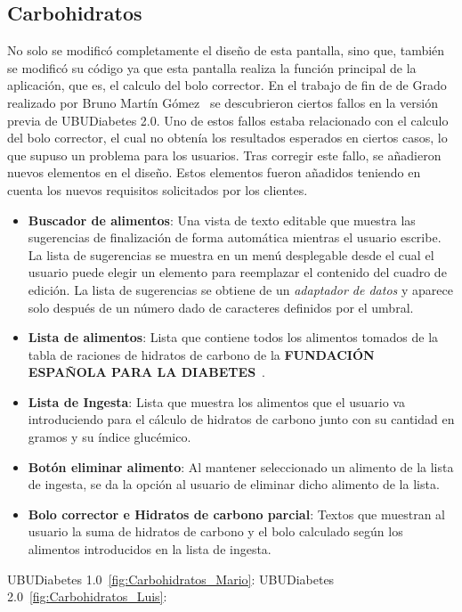 \subsection{Carbohidratos}
No solo se modificó completamente el diseño de esta pantalla, sino que, también se modificó su código ya que esta pantalla realiza la función principal de la aplicación, que es, el calculo del bolo corrector. En el trabajo de fin de de Grado realizado por Bruno Martín Gómez~\cite{bruno2017} se descubrieron ciertos fallos en la versión previa de UBUDiabetes 2.0. Uno de estos fallos estaba relacionado con el calculo del bolo corrector, el cual no obtenía los resultados esperados en ciertos casos, lo que supuso un problema para los usuarios. Tras corregir este fallo, se añadieron nuevos elementos en el diseño. Estos elementos fueron añadidos teniendo en cuenta los nuevos requisitos solicitados por los clientes.\\
\begin{itemize}
	\item \textbf{Buscador de alimentos}: Una vista de texto editable que muestra las sugerencias de finalización de forma automática mientras el usuario escribe. La lista de sugerencias se muestra en un menú desplegable desde el cual el usuario puede elegir un elemento para reemplazar el contenido del cuadro de edición. La lista de sugerencias se obtiene de un \textit{adaptador de datos} y aparece solo después de un número dado de caracteres definidos por el umbral.
	\item \textbf{Lista de alimentos}: Lista que contiene todos los alimentos tomados de la tabla de raciones de hidratos de carbono de la \textbf{FUNDACIÓN ESPAÑOLA PARA LA DIABETES}~\cite{tablafe}.
	\item \textbf{Lista de Ingesta}: Lista que muestra los alimentos que el usuario va introduciendo para el cálculo de hidratos de carbono junto con su cantidad en gramos y su índice glucémico. 
	\item \textbf{Botón eliminar alimento}: Al mantener seleccionado un alimento de la lista de ingesta, se da la opción al usuario de eliminar dicho alimento de la lista.
	\item \textbf{Bolo corrector e Hidratos de carbono parcial}: Textos que muestran al usuario la suma de hidratos de carbono y el bolo calculado según los alimentos introducidos en la lista de ingesta.
\end{itemize}
\newpage
UBUDiabetes 1.0~\ref{fig:Carbohidratos_Mario}:
UBUDiabetes 2.0~\ref{fig:Carbohidratos_Luis}:
\newpage
